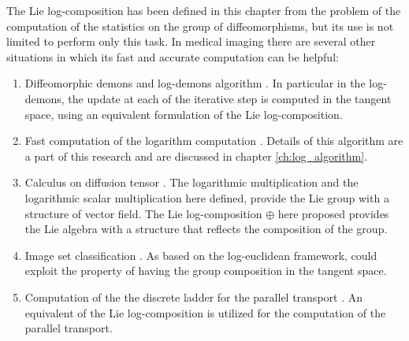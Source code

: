 The Lie log-composition has been defined in this chapter from the problem of the computation of the statistics on the group of diffeomorphisms, but its use is not limited to perform only this task.
In medical imaging there are several other situations in which its fast and accurate computation can be helpful:
\begin{enumerate}
	\item Diffeomorphic demons \cite{vercauteren2007non} and log-demons algorithm \cite{vercauteren08}. In particular in the log-demons, the update at each of the iterative step is computed in the tangent space, using an equivalent formulation of the Lie log-composition. 
	\item Fast computation of the logarithm computation \cite{Bossa:08}. Details of this algorithm are a part of this research and are discussed in chapter \ref{ch:log_algorithm}.
	\item Calculus on diffusion tensor \cite{Arsigny:MRM:06}. The logarithmic multiplication and the logarithmic scalar multiplication here defined, provide the Lie group with a structure of vector field. The Lie log-composition $\oplus$ here proposed provides the Lie algebra with a structure that reflects the composition of the group.  
	\item Image set classification \cite{huanglog}. As based on the log-euclidean framework, could exploit the property of having the group composition in the tangent space.
	\item Computation of the the discrete ladder for the parallel transport \cite{Lorenzi:discrete_ladders:14}. An equivalent of the Lie log-composition is utilized for the computation of the parallel transport.
\end{enumerate}	

